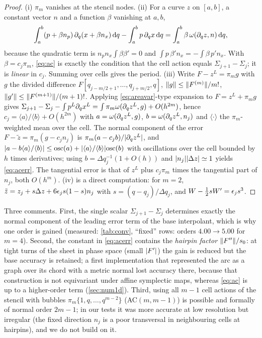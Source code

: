 \begin{proof}
(i) $\pi_m$ vanishes at the stencil nodes. (ii) For a curve $z$ on $[a,b]$, a constant vector $n$ and a function
$\beta$ vanishing at $a,b$,
\begin{equation}\label{eq:areavar}
\int_a^b(p+\beta n_p)\,\partial_q(x+\beta n_x)\,\mathrm{d} q-\int_a^bp\,\partial_qx\,\mathrm{d} q=\int_a^b\beta\,\omega(\partial_qz,n)\,\mathrm{d} q ,
\end{equation}
because the quadratic term is $n_pn_x\int\beta\beta'=0$ and $\int p\,\beta'n_x=-\int\beta\,p'n_x$. With
$\beta=c_j\pi_m$, \eqref{eq:ac} is exactly the condition that the cell action equals $\Sigma_{j+1}-\Sigma_j$; it is
\emph{linear} in $c_j$. Summing over cells gives the period. (iii) Write $F-z^L=\pi_mg$ with $g$ the divided
difference $F[q_{j-m/2+1},\dots,q_{j+m/2},q]$, $\lVert g\rVert\le\lVert F^{(m)}\rVert/m!$, $\lVert g'\rVert\le\lVert F^{(m+1)}\rVert/(m+1)!$.
Applying \eqref{eq:areavar}-type expansion to $F=z^L+\pi_mg$ gives
$\Sigma_{j+1}-\Sigma_j-\int p^L\partial_qx^L=\int\pi_m\omega(\partial_qz^L,g)+O(h^{2m})$, hence
$c_j=\langle a\rangle/\langle b\rangle+O(h^{2m})$ with $a=\omega(\partial_qz^L,g)$, $b=\omega(\partial_qz^L,n_j)$ and
$\langle\cdot\rangle$ the $\pi_m$-weighted mean over the cell. The normal component of the error
$F-\tilde z=\pi_m(g-c_jn_j)$ is $\pi_m(a-c_jb)/\lvert \partial_qz^L\rvert$, and
$\lvert a-b\langle a\rangle/\langle b\rangle\rvert\le\mathrm{osc}(a)+\lvert \langle a\rangle/\langle b\rangle\rvert\mathrm{osc}(b)$
with oscillations over the cell bounded by $h$ times derivatives; using $b=\Delta q_j^{-1}(1+O(h))$ and
$\lvert n_j\rvert\lvert \Delta z\rvert\simeq1$ yields \eqref{eq:acerr}. The tangential error is that of $z^L$ plus $c_j\pi_m$ times
the tangential part of $n_j$, both $O(h^m)$. (iv) is a direct computation: for $m=2$,
$\tilde z=z_j+s\Delta z+6\epsilon_js(1-s)n_j$ with $s=(q-q_j)/\Delta q_j$, and $W-\tfrac12sW'=\epsilon_js^3$.
\end{proof}

Three comments. First, the single scalar $\Sigma_{j+1}-\Sigma_j$ determines exactly the normal component of the
leading error term of the base interpolant, which is why one order is gained (measured:
\cref{tab:conv}, ``fixed'' rows: orders $4.00\to5.00$ for $m=4$). Second, the constant in \eqref{eq:acerr} contains the
\emph{hairpin factor} $\lVert F''\rVert/s_0$: at tight turns of the sheet in phase space (small $\lvert F'\rvert$) the gain is
reduced but the base accuracy is retained; a first implementation that represented the arc as a graph over its
chord with a metric normal lost accuracy there, because that construction is not equivariant under affine
symplectic maps, whereas \eqref{eq:ac} is up to a higher-order term (\cref{sec:num1d}). Third, using all $m-1$
cell actions of the stencil with bubbles $\pi_m\{1,q,\dots,q^{m-2}\}$ (AC$(m,m-1)$) is possible and formally of
normal order $2m-1$; in our tests it was more accurate at low resolution but irregular (the fixed direction $n_j$
is a poor transversal in neighbouring cells at hairpins), and we do not build on it.

